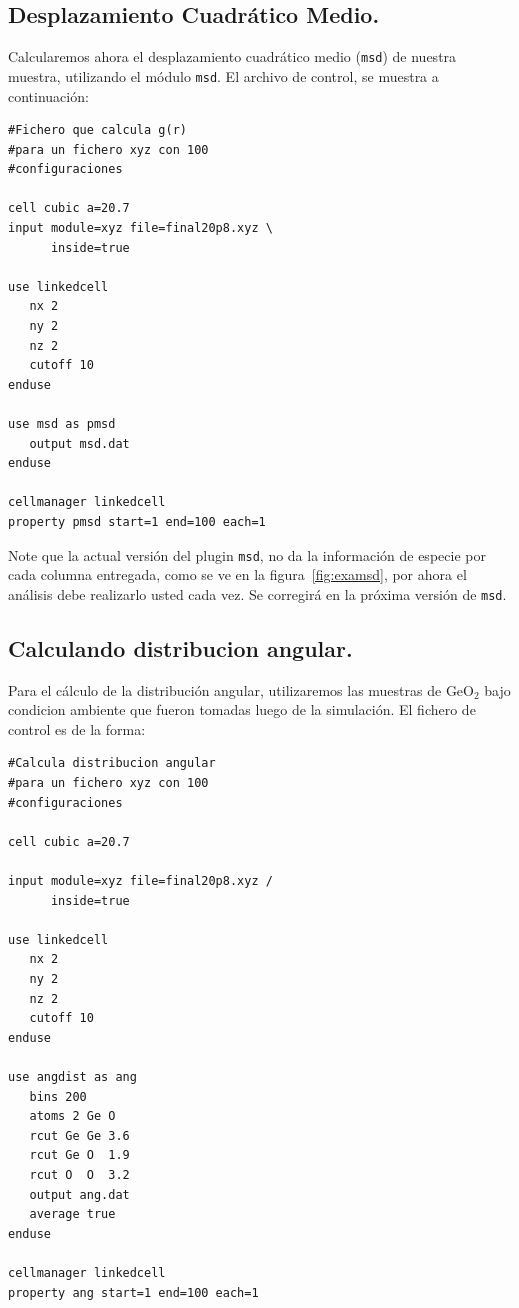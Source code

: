 
\subsection{Desplazamiento Cuadr\'atico Medio.}

Calcularemos ahora el desplazamiento cuadr\'atico medio (\verb|msd|) de nuestra muestra, utilizando el m\'odulo \verb|msd|. El archivo de control, se muestra a continuaci\'on:

\begin{multicols}{2}
\setlength{\columnseprule}{.5pt}
\begin{verbatim}
#Fichero que calcula g(r)
#para un fichero xyz con 100 
#configuraciones

cell cubic a=20.7
input module=xyz file=final20p8.xyz \
      inside=true

use linkedcell
   nx 2
   ny 2
   nz 2
   cutoff 10
enduse

use msd as pmsd
   output msd.dat
enduse

cellmanager linkedcell
property pmsd start=1 end=100 each=1
\end{verbatim}
\end{multicols}


Note que la actual versi\'on del plugin \verb|msd|, no da la informaci\'on de especie por cada columna entregada, como se ve en la figura~\ref{fig:examsd}, por ahora el an\'alisis debe realizarlo usted cada vez. Se corregir\'a en la pr\'oxima versi\'on de \verb|msd|.

\subsection{Calculando distribucion angular.}

Para el c\'alculo de la distribuci\'on angular, utilizaremos las muestras de GeO$_2$ bajo condicion ambiente que fueron tomadas luego de la simulaci\'on. El fichero de control es de la forma:

\begin{multicols}{2}
\setlength{\columnseprule}{.5pt}
\begin{verbatim}
#Calcula distribucion angular
#para un fichero xyz con 100 
#configuraciones

cell cubic a=20.7

input module=xyz file=final20p8.xyz /
      inside=true

use linkedcell
   nx 2
   ny 2
   nz 2
   cutoff 10
enduse

use angdist as ang
   bins 200
   atoms 2 Ge O
   rcut Ge Ge 3.6
   rcut Ge O  1.9
   rcut O  O  3.2
   output ang.dat
   average true
enduse

cellmanager linkedcell
property ang start=1 end=100 each=1
\end{verbatim}
\end{multicols}

